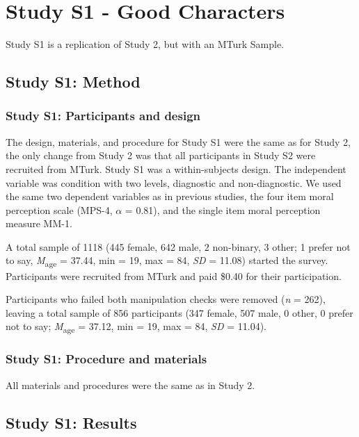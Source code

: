\documentclass[
  man,floatsintext]{apa6}
\begin{document}
\pagebreak

\section{Study S1 - Good Characters}\label{study-s1---good-characters}

Study S1 is a replication of Study 2, but with an MTurk Sample.

\subsection{Study S1: Method}\label{study-s1-method}

\subsubsection{Study S1: Participants and design}\label{study-s1-participants-and-design}

The design, materials, and procedure for Study S1 were the same as for Study 2, the only change from Study 2 was that all participants in Study S2 were recruited from MTurk. Study S1 was a within-subjects design. The independent variable was condition with two levels, diagnostic and non-diagnostic. We used the same two dependent variables as in previous studies, the four item moral perception scale (MPS-4, \(\alpha\) = 0.81), and the single item moral perception measure MM-1.

A total sample of 1118 (445 female, 642 male, 2 non-binary, 3 other; 1 prefer not to say, \emph{M}\textsubscript{age} = 37.44, min = 19, max = 84, \emph{SD} = 11.08) started the survey. Participants were recruited from MTurk and paid \$0.40 for their participation.

Participants who failed both manipulation checks were removed (\emph{n} = 262), leaving a total sample of 856 participants (347 female, 507 male, 0 other, 0 prefer not to say; \emph{M}\textsubscript{age} = 37.12, min = 19, max = 84, \emph{SD} = 11.04).

\subsubsection{Study S1: Procedure and materials}\label{study-s1-procedure-and-materials}

All materials and procedures were the same as in Study 2.

\subsection{Study S1: Results}\label{study-s1-results}
\end{document}
